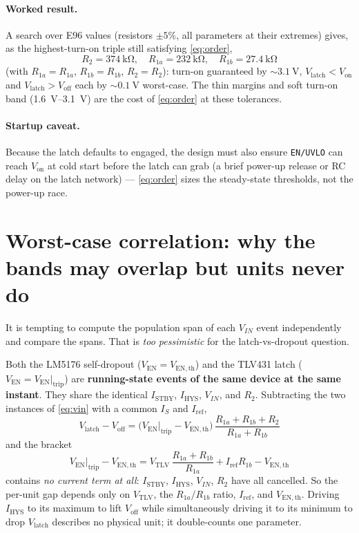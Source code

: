 \documentclass[11pt]{article}
\newcommand{\Ven}{V_{\mathrm{EN}}}
\newcommand{\Vtlv}{V_{\mathrm{TLV}}}
\newcommand{\Vth}{V_{\mathrm{EN,th}}}
\newcommand{\Iref}{I_{\mathrm{ref}}}
\newcommand{\Istby}{I_{\mathrm{STBY}}}
\newcommand{\Ihys}{I_{\mathrm{HYS}}}
\newcommand{\Rone}{R_{1a}}
\newcommand{\Rtwo}{R_{1b}}
\newcommand{\Rt}{R_{2}}
\begin{document}
\paragraph{Worked result.}
A search over E96 values (resistors $\pm5\%$, all parameters at their extremes) gives, as
the highest-turn-on triple still satisfying \eqref{eq:order},
\[
\Rt=\SI{374}{\kilo\ohm},\quad \Rone=\SI{232}{\kilo\ohm},\quad \Rtwo=\SI{27.4}{\kilo\ohm}
\]
(with $\Rone=R_{1a}$, $\Rtwo=R_{1b}$, $\Rt=R_2$): turn-on guaranteed by $\sim\!\SI{3.1}{\volt}$,
$V_{\mathrm{latch}}<V_{\mathrm{on}}$ and $V_{\mathrm{latch}}>V_{\mathrm{off}}$ each by
$\sim\!\SI{0.1}{\volt}$ worst-case. The thin margins and soft turn-on band
(\SIrange{1.6}{3.1}{\volt}) are the cost of \eqref{eq:order} at these tolerances.

\paragraph{Startup caveat.}
Because the latch defaults to engaged, the design must also ensure \texttt{EN/UVLO} can
reach $V_{\mathrm{on}}$ at cold start before the latch can grab (a brief power-up release
or RC delay on the latch network) --- \eqref{eq:order} sizes the steady-state thresholds,
not the power-up race.

\section{Worst-case correlation: why the bands may overlap but units never do}

It is tempting to compute the population span of each $V_{IN}$ event independently and
compare the spans. That is \emph{too pessimistic} for the latch-vs-dropout question.

Both the LM5176 self-dropout ($\Ven=\Vth$) and the TLV431 latch ($\Ven=\Ven|_{\mathrm{trip}}$)
are \textbf{running-state events of the same device at the same instant}. They share the
identical $\Istby$, $\Ihys$, $V_{IN}$, and $\Rt$. Subtracting the two instances of
\eqref{eq:vin} with a common $I_S$ and $\Iref$,
\begin{equation}
\boxed{\;V_{\mathrm{latch}}-V_{\mathrm{off}}
=\big(\Ven|_{\mathrm{trip}}-\Vth\big)\,\frac{\Rone+\Rtwo+\Rt}{\Rone+\Rtwo}\;}
\label{eq:gap}
\end{equation}
and the bracket
\[
\Ven|_{\mathrm{trip}}-\Vth=\Vtlv\,\frac{\Rone+\Rtwo}{\Rone}+\Iref\Rtwo-\Vth
\]
contains \emph{no current term at all}: $\Istby$, $\Ihys$, $V_{IN}$, $\Rt$ have all
cancelled. So the per-unit gap depends only on $\Vtlv$, the $\Rone/\Rtwo$ ratio, $\Iref$,
and $\Vth$. Driving $\Ihys$ to its maximum to lift $V_{\mathrm{off}}$ while
simultaneously driving it to its minimum to drop $V_{\mathrm{latch}}$ describes no
physical unit; it double-counts one parameter.
\end{document}
